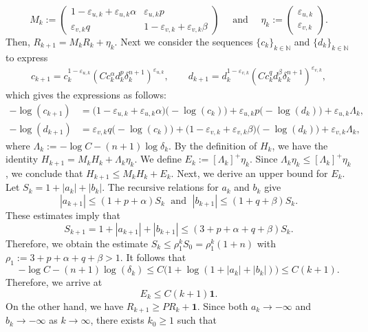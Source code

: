 \documentclass[11pt,reqno]{amsart}
\begin{document}
	\[
	M_k:=\begin{pmatrix}
		1-\varepsilon_{u,k}+\varepsilon_{u,k}\alpha
		&
		\varepsilon_{u,k}p
		\\[2mm]
		\varepsilon_{v,k}q
		&
		1-\varepsilon_{v,k}+\varepsilon_{v,k}\beta
	\end{pmatrix}
	\quad\text{ and }\quad
	\eta_k:=
	\begin{pmatrix}
		\varepsilon_{u,k}\\
		\varepsilon_{v,k}
	\end{pmatrix}.
	\]
	Then, $R_{k+1}=M_kR_k+\eta_k$. Next we consider the sequences $\{c_k\}_{k\in \mathbb N}$ and
	$\{d_k\}_{k\in \mathbb N}$ to express
	\begin{align*}
		c_{k+1}=c_k^{1-\varepsilon_{u,k}}
		\left(C c_k^{\alpha}d_k^{p}
		\delta_k^{n+1}
		\right)^{\varepsilon_{u,k}},\qquad d_{k+1}=d_k^{1-\varepsilon_{v,k}}
		\left(C c_k^{q}d_k^{\beta}
		\delta_k^{n+1}
		\right)^{\varepsilon_{v,k}},
	\end{align*}
	which gives the expressions as follows:
	\[
	\begin{aligned}
		-\log(c_{k+1}) &=\bigl(1-\varepsilon_{u,k}+\varepsilon_{u,k}\alpha\bigr)
		\bigl(-\log(c_k)\bigr)+\varepsilon_{u,k}p
		\bigl(-\log(d_k)\bigr)+\varepsilon_{u,k}\Lambda_k, \\
		-\log(d_{k+1}) &=\varepsilon_{v,k}q
		\bigl(-\log(c_k)\bigr)+\bigl(1-\varepsilon_{v,k}
		+\varepsilon_{v,k}\beta\bigr)
		\bigl(-\log(d_k)\bigr)+\varepsilon_{v,k}\Lambda_k,
	\end{aligned}
	\]
	where $\Lambda_k:=-\log C-(n+1)\log\delta_k$. By the definition of $H_k$, we have the identity $H_{k+1}=M_kH_k+\Lambda_k\eta_k$. We define $E_k:=[\Lambda_k]^{+}\eta_k$. Since $\Lambda_k\eta_k\leq[\Lambda_k]^{+}\eta_k$, we conclude that $H_{k+1}\leq M_kH_k+E_k$. Next, we derive an upper bound for $E_k$. Let $S_k=1+|a_k|+|b_k|$. The recursive relations for $a_k$ and $b_k$ give
	\[
	|a_{k+1}|\leq (1+p+\alpha)S_k\; \text{  and  }\;|b_{k+1}|\leq (1+q+\beta)S_k.
	\]
	These estimates imply that
	\[
	S_{k+1}=1+|a_{k+1}|+|b_{k+1}|\leq (3+p+\alpha+q+\beta)S_k.
	\]
	Therefore, we obtain the estimate $S_{k}\leq \rho_1^kS_0=\rho_1^k(1+n)$ with $\rho_1:=3+p+\alpha+q+\beta>1$. It follows that
	\[
	-\log C- (n+1)\log(\delta_k)\leq C\bigl(1+\log(1+|a_k|+|b_k|)\bigr)\leq C(k+1).
	\]
	Therefore, we arrive at
	\begin{equation}\label{es_for_E}
		E_k\leq C(k+1)\boldsymbol{1}.
	\end{equation}
	On the other hand, we have $R_{k+1}\geq PR_k+\boldsymbol{1}$. Since both $a_k\to-\infty$ and $b_k\to-\infty$ as $k\to\infty$, there exists $k_0\geq1$ such that
\end{document}
